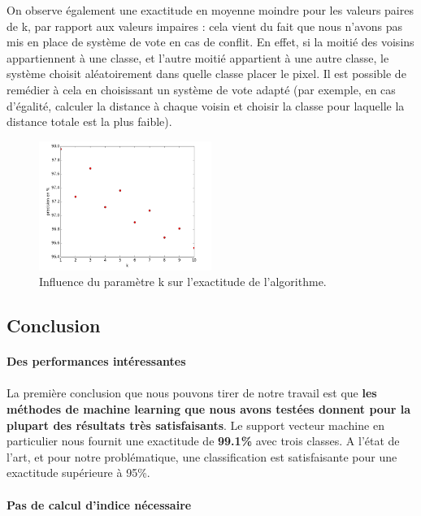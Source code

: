 \documentclass[a4paper,10pt]{article}
\begin{document}
On observe également une exactitude en moyenne moindre pour les valeurs paires de k, par rapport aux valeurs impaires : cela vient du fait que nous n'avons pas mis en place de système de vote en cas de conflit. En effet, si la moitié des voisins appartiennent à une classe, et l'autre moitié appartient à une autre classe, le système choisit aléatoirement dans quelle classe placer le pixel. Il est possible de remédier à cela en choisissant un système de vote adapté (par exemple, en cas d'égalité, calculer la distance à chaque voisin et choisir la classe pour laquelle la distance totale est la plus faible).

\begin{figure}[H]
  \centering
    \includegraphics[width=0.5\textwidth]{influencek}
  \caption{Influence du paramètre k sur l'exactitude de l'algorithme.}
  \label{fig:kNN}
\end{figure}

\subsection{Conclusion}

\paragraph{Des performances intéressantes}
\paragraph{}
La première conclusion que nous pouvons tirer de notre travail est que \textbf{les méthodes de machine learning que nous avons testées donnent pour la plupart des résultats très satisfaisants}. Le support vecteur machine en particulier nous fournit une exactitude de \textbf{99.1\%} avec trois classes. A l'état de l'art, et pour notre problématique, une classification est satisfaisante pour une exactitude supérieure à 95\%.

\paragraph{Pas de calcul d'indice nécessaire}
\end{document}
